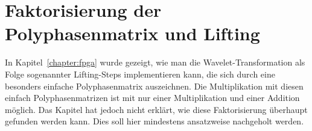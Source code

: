 %
%
%
\chapter{Faktorisierung der Polyphasenmatrix und Lifting
\label{chapter:lifting}}
\rhead{}
\begin{refsection}

{\parindent 0pt
In Kapitel~\ref{chapter:fpga} wurde gezeigt, wie man die
Wavelet-Transformation als Folge sogenannter Lifting-Steps implementieren
kann, die sich durch eine besonders einfache Polyphasenmatrix auszeichnen.}
Die Multiplikation mit diesen einfach Polyphasenmatrizen ist mit nur
einer Multiplikation und einer Addition möglich.
Das Kapitel hat jedoch nicht erklärt, wie diese Faktorisierung
überhaupt gefunden werden kann.
Dies soll hier mindestens ansatzweise nachgeholt werden.




\printbibliography[heading=subbibliography]
\end{refsection}

